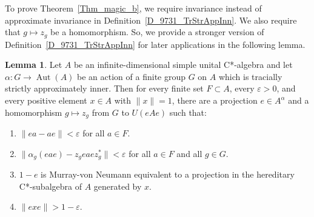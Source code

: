 \documentclass[10pt]{amsart}
\numberwithin{equation}{section}
\theoremstyle{definition}
\newtheorem{lem}[thm]{Lemma}
\newcommand{\af}{\alpha}
\newcommand{\ep}{\varepsilon}
\newcommand{\Aut}{{\operatorname{Aut}}}
\newcommand{\hm}{homomorphism}
\newcommand{\hsa}{hereditary C*-subalgebra}
\newcommand{\pj}{projection}
\newcommand{\mvnt}{Murray-von Neumann equivalent}
\renewcommand{\S}{\subset}
\begin{document}
To prove Theorem~\ref{Thm_magic_b}, we require invariance instead of approximate invariance
 in Definition~\ref{D_9731_TrStrAppInn}. We also require that $g \mapsto z_g$ be a homomorphism.
So, we provide a stronger version of Definition~\ref{D_9731_TrStrAppInn} for later applications in the following lemma.
\begin{lem}\label{L_Invariant_Pr}
Let $A$ be an infinite-dimensional simple  unital C*-algebra
and let $\af \colon G \to \Aut (A)$
be an action of a finite  group $G$ on $A$ which is tracially strictly approximately inner.
Then 
for every finite set $F \S A$, every $\ep > 0$,
and every positive element $x \in A$ with $\| x \| = 1$,
there are a \pj{} $e \in A^\af$
and a \hm{} $g \mapsto z_g$
from $G$ to $U (e A e)$ such that:
\begin{enumerate}
\item\label{D_9731_TrStrAppInn:1} 
$\| e a - a e \| < \ep$ for all $a \in F$.
\item\label{D_9731_TrStrAppInn:2}
$\| \af_g (e a e) - z_g e a e z_g^* \| < \ep$
for all $a \in F$ and all $g \in G$.
\item\label{D_9731_TrStrAppInn:4} 
$1 - e$ is \mvnt{} to a
\pj{} in the \hsa{} of $A$ generated by $x$.
\item\label{D_9731_TrStrAppInn:5} 
$\| e x e \| > 1 - \ep$.
\end{enumerate}
\end{lem}
\end{document}
